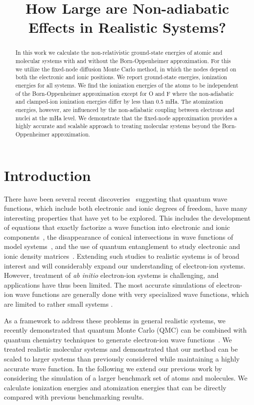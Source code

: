 \documentclass[pra,superscriptaddress,groupedaddress,twocolumn]{revtex4}
\begin{document}
\title{How Large are Non-adiabatic Effects in Realistic Systems?}

\begin{abstract}
In this work we calculate the non-relativistic ground-state energies of atomic and molecular systems with and without the Born-Oppenheimer approximation. For this we utilize the fixed-node diffusion Monte Carlo method, in which the nodes depend on both the electronic and ionic positions. We report ground-state energies, ionization energies for all systems. We find the ionization energies of the atoms to be independent of the Born-Oppenheimer approximation except for O and F where the non-adiabatic and clamped-ion ionization energies differ by less than 0.5 mHa. The atomization energies, however, are influenced by the non-adiabatic coupling between electrons and nuclei at the mHa level. We demonstrate that the fixed-node approximation provides a highly accurate and scalable approach to treating molecular systems beyond the Born-Oppenheimer approximation.
\end{abstract}
\maketitle

\section{Introduction}
There have been several recent discoveries~\cite{cederbaum1,gross2014,boent} suggesting that quantum wave functions, which include both electronic and ionic degrees of freedom, have many interesting properties that have yet to be explored.  This includes the development of equations that exactly factorize a wave function into electronic and ionic components~\cite{cederbaum1}, the disappearance of conical intersections in wave functions of model systems~\cite{gross2014}, and the use of quantum entanglement to study electronic and ionic density matrices~\cite{boent}. Extending such studies to realistic systems is of broad interest and will considerably expand our understanding of electron-ion systems. However, treatment of \textit{ab initio} electron-ion systems is challenging, and applications have thus been limited. The most accurate simulations of electron-ion wave functions are generally done with very specialized wave functions, which are limited to rather small systems \cite{mitroy2013}.  

As a framework to address these problems in general realistic systems, we recently demonstrated that quantum Monte Carlo (QMC) can be combined with quantum chemistry techniques to generate electron-ion wave functions~\cite{Tubman_ECG}. We treated realistic molecular systems and demonstrated that our method can be scaled to larger systems than previously considered while maintaining a highly accurate wave function. In the following we extend our previous work by considering the simulation of a larger benchmark set of atoms and molecules.  We calculate ionization energies and atomization energies that can be directly compared with previous benchmarking results. 
\end{document}
